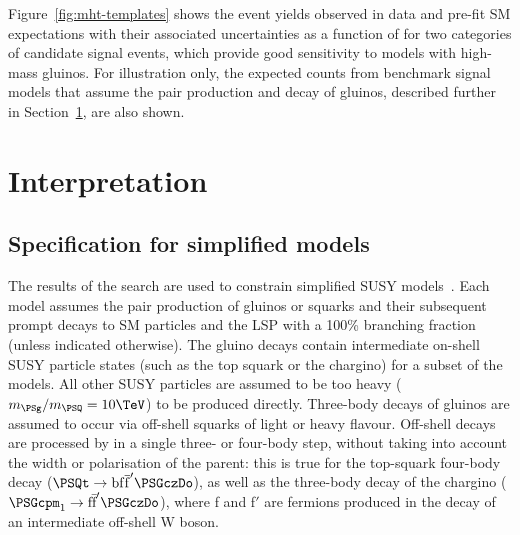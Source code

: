 Figure~\ref{fig:mht-templates} shows the event yields observed in data
and pre-fit SM expectations with their associated uncertainties as
a function of \HTmiss for two categories of candidate signal events,
which provide good sensitivity to models with high-mass gluinos. For
illustration only, the expected counts from benchmark signal models
that assume the pair production and decay of gluinos, described
further in Section~\ref{sec:interpretations}, are also shown.


\section{Interpretation}
\label{sec:interpretations}

\subsection{Specification for simplified models}

The results of the search are used to constrain simplified SUSY
models~\cite{Alwall:2008ag, Alwall:2008va, sms}. Each model assumes
the pair production of gluinos or squarks and their subsequent prompt
decays to SM particles and the LSP with a 100\% branching fraction
(unless indicated otherwise). The gluino decays contain intermediate
on-shell SUSY particle states (such as the top squark or the chargino)
for a subset of the models. All other SUSY particles are assumed to be
too heavy ($m_{\PSg} / m_{\PSQ} = 10\TeV$) to be produced
directly. Three-body decays of gluinos are assumed to occur via
off-shell squarks of light or heavy flavour. Off-shell decays are
processed by \PYTHIA in a single three- or four-body step, without
taking into account the width or polarisation of the parent: this is
true for the top-squark four-body decay ($\PSQt \to
\mathrm{bf}\overline{\mathrm{f}}'\PSGczDo$), as well as the three-body decay of
the chargino ($\PSGcpm_1 \to  \text{f}\bar{\text{f}}'\PSGczDo$), where f
and f$'$ are fermions produced in the decay of an intermediate
off-shell W boson.

